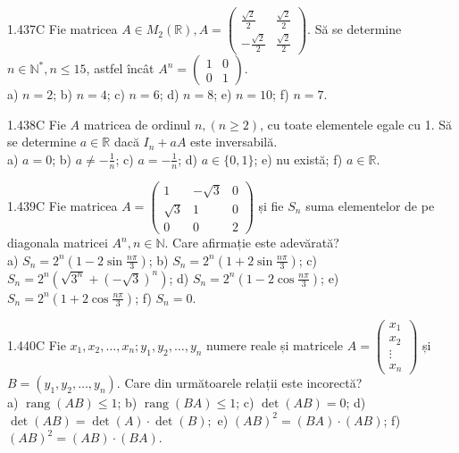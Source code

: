 \documentclass[11pt]{article}
\begin{document}
1.437C Fie matricea $A \in M_{2}(\mathbb{R}), A=\left(\begin{array}{cc}\frac{\sqrt{2}}{2} & \frac{\sqrt{2}}{2} \\ -\frac{\sqrt{2}}{2} & \frac{\sqrt{2}}{2}\end{array}\right)$. Să se determine $n \in \mathbb{N}^{*}, n \leq 15$, astfel încât $A^{n}=\left(\begin{array}{ll}1 & 0 \\ 0 & 1\end{array}\right)$.\\ a) $n=2$; b) $n=4$; c) $n=6$; d) $n=8$; e) $n=10$; f) $n=7$.

1.438C Fie $A$ matricea de ordinul $n,(n \geq 2)$, cu toate elementele egale cu 1. Să se determine $a \in \mathbb{R}$ dacă $I_{n}+a A$ este inversabilă.\\ a) $a=0$; b) $a \neq-\frac{1}{n}$; c) $a=-\frac{1}{n}$; d) $a \in\{0,1\}$; e) nu există; f) $a \in \mathbb{R}$.

1.439C Fie matricea $A=\left(\begin{array}{ccc}1 & -\sqrt{3} & 0 \\ \sqrt{3} & 1 & 0 \\ 0 & 0 & 2\end{array}\right)$ și fie $S_{n}$ suma elementelor de pe diagonala matricei $A^{n}, n \in \mathbb{N}$. Care afirmație este adevărată?\\ a) $S_{n}=2^{n}\left(1-2 \sin \frac{n \pi}{3}\right)$; b) $S_{n}=2^{n}\left(1+2 \sin \frac{n \pi}{3}\right)$; c) $S_{n}=2^{n}\left(\sqrt{3^{n}}+(-\sqrt{3})^{n}\right)$; d) $S_{n}=2^{n}\left(1-2 \cos \frac{n \pi}{3}\right)$; e) $S_{n}=2^{n}\left(1+2 \cos \frac{n \pi}{3}\right)$; f) $S_{n}=0$.

1.440C Fie $x_{1}, x_{2}, \ldots, x_{n} ; y_{1}, y_{2}, \ldots, y_{n}$ numere reale și matricele $A=\left(\begin{array}{c}x_{1} \\ x_{2} \\ \vdots \\ x_{n}\end{array}\right)$ și $B=\left(y_{1}, y_{2}, \ldots, y_{n}\right)$. Care din următoarele relații este incorectă?\\ a) $\operatorname{rang}(A B) \leq 1$; b) $\operatorname{rang}(B A) \leq 1$; c) $\operatorname{det}(A B)=0$; d) $\operatorname{det}(A B)=\operatorname{det}(A) \cdot \operatorname{det}(B) ;$ e) $(A B)^{2}=(B A) \cdot(A B)$; f) $(A B)^{2}=(A B) \cdot(B A)$.
\end{document}
